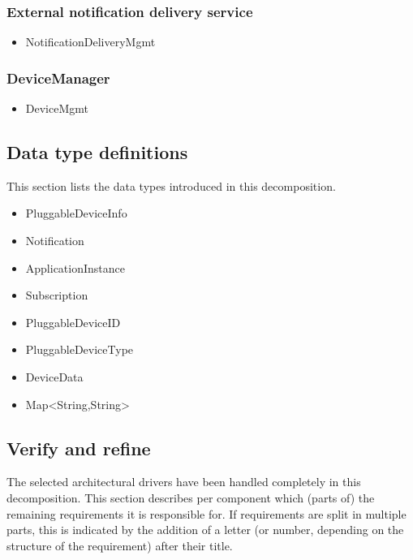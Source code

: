     \subsubsection{External notification delivery service}
        \begin{itemize}
            \item NotificationDeliveryMgmt
        \end{itemize}

    \subsubsection{DeviceManager}
        \begin{itemize}
        	\item DeviceMgmt
        \end{itemize}


\subsection{Data type definitions}
    This section lists the data types introduced in this decomposition.

    \begin{itemize}
        \item{PluggableDeviceInfo}
        \item{Notification}
        \item{ApplicationInstance}
        \item{Subscription}
        \item{PluggableDeviceID}
        \item{PluggableDeviceType}
        \item{DeviceData}
        \item{Map<String,String>}
    \end{itemize}

\subsection{Verify and refine}
    The selected architectural drivers have been handled completely
    in this decomposition.
    This section describes per component which (parts of) the remaining
    requirements it is responsible for. If requirements are split in
    multiple parts, this is indicated by the addition of a letter
    (or number, depending on the structure of the requirement) after their title.

